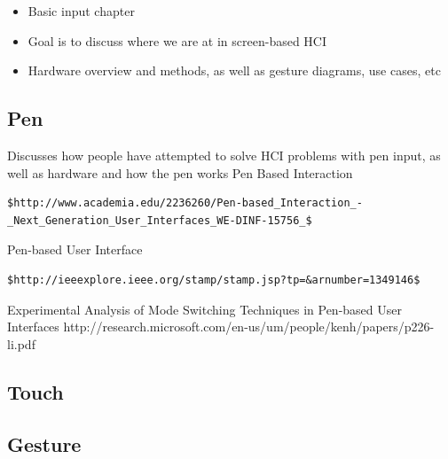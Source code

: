 \documentclass[12pt]{report}
\begin{document}
\begin{itemize}
\item Basic input chapter
\item Goal is to discuss where we are at in screen-based HCI
\item Hardware overview and methods, as well as gesture diagrams, use cases, etc
\end{itemize}
\subsection{Pen}

Discusses how people have attempted to solve HCI problems with pen input, as well as hardware and how the pen works 
Pen Based Interaction 
\begin{verbatim}
$http://www.academia.edu/2236260/Pen-based_Interaction_-_Next_Generation_User_Interfaces_WE-DINF-15756_$
\end{verbatim}
Pen-based User Interface 
\begin{verbatim}
$http://ieeexplore.ieee.org/stamp/stamp.jsp?tp=&arnumber=1349146$
\end{verbatim}
Experimental Analysis of Mode Switching Techniques in Pen-based User Interfaces http://research.microsoft.com/en-us/um/people/kenh/papers/p226-li.pdf
\subsection{Touch}

\subsection{Gesture}
\end{document}
